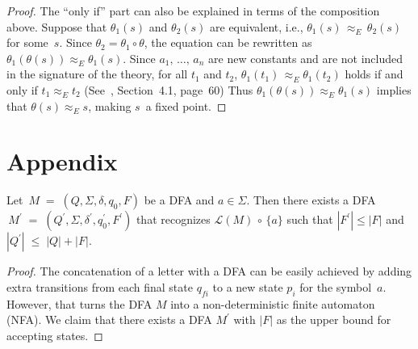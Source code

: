 \documentclass{lmcs} %
\theoremstyle{plain}\newtheorem{satz}[thm]{Satz} %
\begin{document}
\begin{appendices}
\begin{proof}
The ``only if'' part can also be explained in terms of the composition
above. Suppose that $\theta_1(s)$ and $\theta_2(s)$ are equivalent,
i.e., $\theta_1(s) \, \approx_E^{} \, \theta_2(s)$ for some~$s$. Since
$\theta_2 = \theta_1 \circ \theta$, the equation can be rewritten as
$\theta_1(\theta(s)) \approx_E^{} \theta_1(s)$.
Since $a_1, \, \ldots , \, a_n$ are new constants and are not included in the signature of
the theory, for all $t_1$ and $t_2$, $\theta_1(t_1) \, \approx_E^{}
\theta_1(t_2)$ holds if and only if $t_1\approx_E^{} t_2$
(See~\cite{Term}, Section~4.1, page~60)
Thus $\theta_1(\theta(s)) \approx_E^{} \theta_1(s)$ implies that $\theta(s) \approx_E^{} s$, making
$s$~a fixed point. 
\end{proof}



\section{Appendix}
\begin{lem}{\label{DFAConcatLetter}}
Let $\, M \; = \; (Q, \Sigma, \delta, q_0^{}, F)$ be a DFA and $a \in \Sigma$. Then
there exists a DFA\\
$\, M_{}^{\prime} \; = \; (Q_{}^{\prime}, \Sigma, \delta_{}^{\prime}, q_0^{\prime}, F_{}^{\prime})$
that recognizes $\mathcal{L}(M) \, \circ \, \{ a \}$ such that
$| F_{}^{\prime} | \leq |F|$ and $| Q_{}^{\prime} | \; \le \; | Q | + | F |$.
\end{lem}
\begin{proof}
The concatenation of a letter with a DFA can be easily achieved by
adding extra transitions from each final state $q_{fi}$ to a new
state $p_i$ for the symbol~$a$. However, that turns the DFA $M$ into a
non-deterministic finite automaton (NFA). We claim that there exists a
DFA $M_{}^{\prime}$ with $|F|$ as the upper bound for accepting states.


\end{proof}
\end{appendices}
\end{document}
